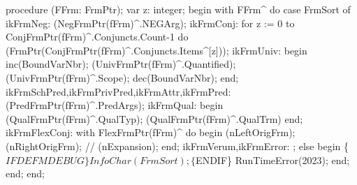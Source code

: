 \nwenddocs{}\endmoddef\nwstartdeflinemarkup{}\nwenddeflinemarkup
procedure (FFrm: FrmPtr);
var
   z: integer;
begin
   with FFrm^ do
      case FrmSort of
         ikFrmNeg: (NegFrmPtr(fFrm)^.NEGArg);
         ikFrmConj:
            for z := 0 to ConjFrmPtr(fFrm)^.Conjuncts.Count-1 do
               (FrmPtr(ConjFrmPtr(fFrm)^.Conjuncts.Items^[z]));
         ikFrmUniv:
            begin
               inc(BoundVarNbr);
               (UnivFrmPtr(fFrm)^.Quantified);
               (UnivFrmPtr(fFrm)^.Scope);
               dec(BoundVarNbr);
            end;
         ikFrmSchPred,ikFrmPrivPred,ikFrmAttr,ikFrmPred:
            (PredFrmPtr(fFrm)^.PredArgs);
         ikFrmQual:
            begin
               (QualFrmPtr(fFrm)^.QualTyp);
               (QualFrmPtr(fFrm)^.QualTrm)
            end;
         ikFrmFlexConj:
            with FlexFrmPtr(fFrm)^ do
         begin
            (nLeftOrigFrm);
            (nRightOrigFrm);
            //       (nExpansion);
         end;
         ikFrmVerum,ikFrmError: ;
      else
      begin
         \{$IFDEF MDEBUG\}
         InfoChar(FrmSort);
         \{$ENDIF\}
         RunTimeError(2023);
      end;
      end;
end;
\eatline
